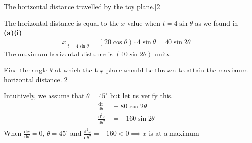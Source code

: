 \documentclass[12pt, a4 paper]{article}
\begin{document}
\begin{outline}[enumerate]
 \3 The horizontal distance travelled by the toy plane.\hfill[2]
 \begin{answer}
  The horizontal distance is equal to the $x$ value when $t=4\sin\theta$ as we found in \textbf{(a)(i)}
  \begin{align*}
   x|_{t=4\sin\theta} = (20\cos\theta)\cdot4\sin\theta = 40\sin2\theta
  \end{align*}
  The maximum horizontal distance is $(40\sin2\theta)$ units.
 \end{answer}

 \2 Find the angle $\theta$ at which the toy plane should be thrown to attain the maximum horizontal distance.\hfill[2]
 \begin{answer}
  Intuitively, we assume that $\theta=45^\circ$ but let us verify this.
  \begin{align*}
   \frac{\mathrm{d}x}{\mathrm{d}\theta}     & = 80\cos2\theta   \\
   \frac{\mathrm{d}^2x}{\mathrm{d}\theta^2} & = -160\sin2\theta \\
  \end{align*}
  When $\frac{\mathrm{d}x}{\mathrm{d}\theta}=0$, $\theta=45^\circ$ and $\frac{\mathrm{d}^2x}{\mathrm{d}\theta^2}=-160<0\implies x$ is at a maximum
 \end{answer}


\end{outline}
\end{document}
